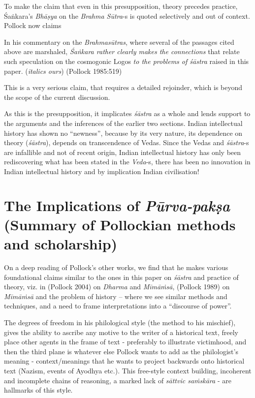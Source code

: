 To make the claim that even in this presupposition, theory precedes practice, Śaṅkara's {\sl Bhāṣya} on the {\sl Brahma Sūtra}-s is quoted selectively and out of context. Pollock now claims 
\begin{myquote}
In his commentary on the {\sl Brahmasūtras}, where several of the passages cited above are marshaled, {\sl Śaṅkara rather clearly makes the connections} that relate such speculation on the cosmogonic Logos {\sl to the problems of śāstra} raised in this paper.
\hfill	({\sl italics ours}) (Pollock 1985:519)
\end{myquote}

This is a very serious claim, that requires a detailed rejoinder, which is beyond the scope of the current discussion. 

As this is the presupposition, it implicates {\sl śāstra} as a whole and lends support to the arguments and the inferences of the earlier two sections. Indian intellectual history has shown no ``newness'', because by its very nature, its dependence on theory ({\sl śāstra}), depends on transcendence of Vedas.  Since the Vedas and {\sl śāstra}-s are infallible and not of recent origin, Indian intellectual history has only been rediscovering what has been stated in the {\sl Veda}-s, there has been no innovation in Indian intellectual history and by implication Indian civilisation!

\section*{The Implications of {{\sl\bfseries Pūrva-pakṣa}\relax} (Summary of Pollockian methods and scholarship)}

On a deep reading of Pollock's other works, we find that he makes various foundational claims similar to the ones in this paper on {\sl śāstra} and practice of theory, viz. in (Pollock 2004) on {\sl Dharma} and {\sl Mīmāṁsā}, (Pollock 1989) on {\sl Mīmāṁsā} and the problem of history -- where we see similar methods and techniques, and a need  to frame interpretations into a ``discourse of power''.

The degrees of freedom in his philological style (the method to his mischief), gives the ability to ascribe any motive to the writer of a historical text, freely place other agents in the frame of text - preferably to illustrate victimhood, and then the third plane is whatever else Pollock wants to add as the philologist's meaning - context/meanings that he wants to project backwards onto historical text (Nazism, events of Ayodhya etc.). This free-style context building, incoherent and incomplete chains of reasoning, a marked lack of {\sl sāttvic saṁskāra} - are hallmarks of this style. 

